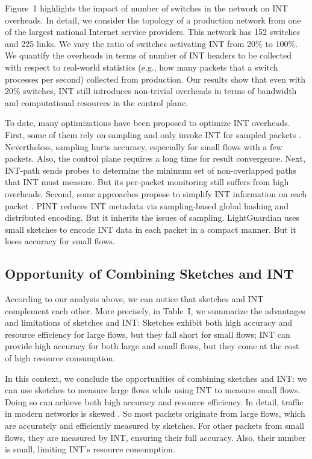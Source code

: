 Figure~1 highlights the impact of number of switches in the network on INT overheads. In detail, we consider the topology of a production network from one of the largest national Internet service providers. This network has 152 switches and 225 links. We vary the ratio of switches activating INT from 20\% to 100\%. We quantify the overheads in terms of number of INT headers to be collected with respect to real-world statistics (e.g., how many packets that a switch processes per second) collected from production. Our results show that even with 20\% switches, INT still introduces non-trivial overheads in terms of bandwidth and computational resources in the control plane. 

To date, many optimizations have been proposed to optimize INT overheads. First, some of them rely on sampling and only invoke INT for sampled packets \cite{tang2019sel,suh2020flexible,kim2018selective,ben2020pint}. Nevertheless, sampling hurts accuracy, especially for small flows with a few packets. Also, the control plane requires a long time for result convergence. Next, INT-path \cite{pan2019int} sends probes to determine the minimum set of non-overlapped paths that INT must measure. But its per-packet monitoring still suffers from high overheads. 
%
Second, some approaches propose to simplify INT information on each packet \cite{ben2020pint,zhao2021lightguardian,sheng2021deltaint}. PINT \cite{ben2020pint} reduces INT metadata via sampling-based global hashing and distributed encoding. But it inherits the issues of sampling. LightGuardian \cite{zhao2021lightguardian} uses small sketches to encode INT data in each packet in a compact manner. But it loses accuracy for small flows. 


\subsection{Opportunity of Combining Sketches and INT}

According to our analysis above, we can notice that sketches and INT complement each other. More precisely, in Table~I, we summarize the advantages and limitations of sketches and INT: Sketches exhibit both high accuracy and resource efficiency for large flows, but they fall short for small flows; INT can provide high accuracy for both large and small flows, but they come at the cost of high resource consumption. 

In this context, we conclude the opportunities of combining sketches and INT: we can use sketches to measure large flows while using INT to measure small flows. Doing so can achieve both high accuracy and resource efficiency. In detail, traffic in modern networks is skewed \cite{roy2015inside,huang2021toward,caida,benson2010network,yang2018elastic}. So most packets originate from large flows, which are accurately and efficiently measured by sketches. For other packets from small flows, they are measured by INT, ensuring their full accuracy. Also, their number is small, limiting INT's resource consumption. 

